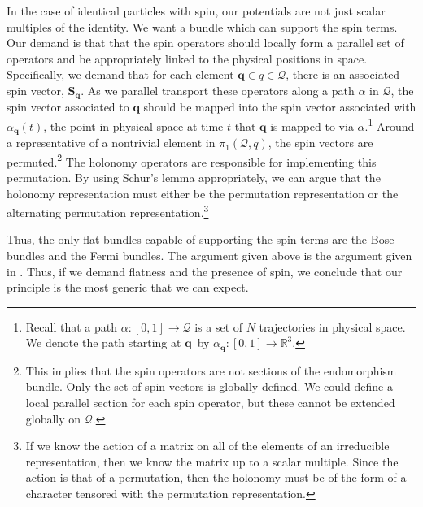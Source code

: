 \documentclass[11pt]{article}
\theoremstyle{remark}
\begin{document}
In the case of identical particles with spin,
 our potentials are not just scalar multiples of the identity. We
want a bundle which can support the spin terms. 
Our demand is that
that the spin operators should locally form a
parallel set of operators and be appropriately linked to the physical
positions in space.  Specifically, we demand that for each element
$\ensuremath{\boldsymbol{q}} \in  \ensuremath{q} 
\in \ensuremath{\mathcal{Q}}$, there
is an associated  spin vector, $\ensuremath{\boldsymbol{S}}_{\ensuremath{\boldsymbol{q}}}$.  As we parallel
transport these 
operators along a 
path $\alpha$ in \ensuremath{\mathcal{Q}}, the spin vector associated to $\ensuremath{\boldsymbol{q}}$ should be
mapped into the spin vector associated with
$\alpha_{\ensuremath{\boldsymbol{q}}}(t)$, the point in physical space at time $t$ that 
$\ensuremath{\boldsymbol{q}}$ is mapped to via $\alpha$.\footnote{Recall that a path $\alpha
: [0,1] \to  
\ensuremath{\mathcal{Q}}$ is a set of $N$ trajectories in physical space. We denote the
path starting at \ensuremath{\boldsymbol{q}}\ by $\alpha_{\ensuremath{\boldsymbol{q}}} : [0,1] \to \ensuremath{\mathbb{R}^{\ensuremath{3}}}$.}  
Around a representative of a nontrivial element in \ensuremath{\pi_1 ({\ensuremath{\mathcal{Q}}, \ensuremath{q}})},
the spin vectors are permuted.\footnote{ 
This implies that the spin operators are not sections of the
endomorphism bundle. Only the set of spin vectors is globally defined.
We could define a local parallel section for each spin operator, but
these cannot be extended globally on \ensuremath{\mathcal{Q}}. 
}
The holonomy operators are responsible for implementing this permutation. 
By using Schur's lemma appropriately, we can argue that the holonomy
representation  must either be the permutation representation or the
alternating permutation 
representation.\footnote{If we know the action of a matrix on all of
 the elements of an irreducible representation, then we know the
 matrix up to a scalar multiple. Since the action is that of a
 permutation, then the holonomy must be of the form of a character
 tensored with the permutation representation.}


 Thus, the only flat bundles capable of supporting the
spin terms are the Bose bundles and the Fermi bundles.
 The argument given above is the argument given in \cite{LM77}.
Thus, if we demand flatness and the presence of spin, we conclude that
our principle is the most generic that we can expect. 
\end{document}
